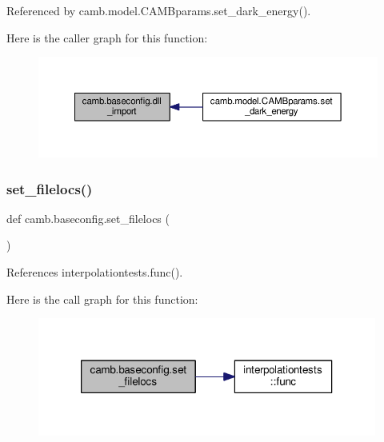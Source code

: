 Referenced by camb.\+model.\+C\+A\+M\+Bparams.\+set\+\_\+dark\+\_\+energy().

Here is the caller graph for this function\+:
\nopagebreak
\begin{figure}[H]
\begin{center}
\leavevmode
\includegraphics[width=350pt]{namespacecamb_1_1baseconfig_a9b1d79118c94ceaefe44393d881c3956_icgraph}
\end{center}
\end{figure}
\mbox{\label{namespacecamb_1_1baseconfig_ab9ccfd74eee84e46eb5061d9397e368a}} 
\subsubsection{\texorpdfstring{set\+\_\+filelocs()}{set\_filelocs()}}
{\footnotesize\ttfamily def camb.\+baseconfig.\+set\+\_\+filelocs (\begin{DoxyParamCaption}{ }\end{DoxyParamCaption})}



References interpolationtests.\+func().

Here is the call graph for this function\+:
\nopagebreak
\begin{figure}[H]
\begin{center}
\leavevmode
\includegraphics[width=316pt]{namespacecamb_1_1baseconfig_ab9ccfd74eee84e46eb5061d9397e368a_cgraph}
\end{center}
\end{figure}


